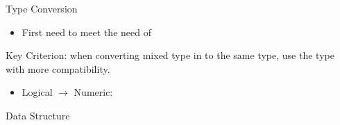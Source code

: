 \begin{point}
    Type Conversion
\end{point}

\begin{itemize}[topsep=2pt,itemsep=0pt]
    \item First need to meet the need of 
\end{itemize}

    
    Key Criterion: when converting mixed type in to the same type, use the type with more compatibility.
\begin{itemize}[topsep=2pt,itemsep=0pt]
    \item Logical $ \to $ Numeric: 
\end{itemize}

    

\begin{point}
    Data Structure
\end{point}
